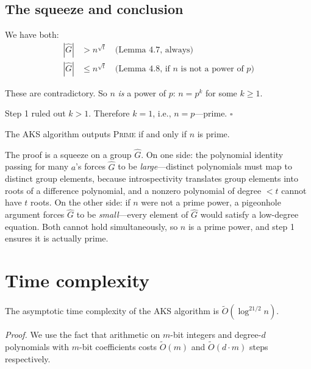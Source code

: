 \documentclass[12pt]{article}
\newcommand{\OO}{\widetilde{O}}
\begin{document}
\subsection{The squeeze and conclusion}

We have both:
\begin{align*}
  |\hat{G}| &> n^{\sqrt{t}} \quad\text{(Lemma 4.7, always)}\\
  |\hat{G}| &\leq n^{\sqrt{t}} \quad\text{(Lemma 4.8, if $n$ is not a power of $p$)}
\end{align*}

These are contradictory. So $n$ \emph{is} a power of $p$: $n=p^k$ for some $k\geq 1$.

Step 1 ruled out $k>1$. Therefore $k=1$, i.e., $n=p$---prime. $\square$

\begin{thmbox}[Theorem 4.1]
The AKS algorithm outputs \textsc{Prime} if and only if $n$ is prime.
\end{thmbox}

\begin{intubox}
The proof is a squeeze on a group $\hat{G}$. On one side: the polynomial identity passing for many $a$'s forces $\hat{G}$ to be \emph{large}---distinct polynomials must map to distinct group elements, because introspectivity translates group elements into roots of a difference polynomial, and a nonzero polynomial of degree $<t$ cannot have $t$ roots. On the other side: if $n$ were not a prime power, a pigeonhole argument forces $\hat{G}$ to be \emph{small}---every element of $\hat{G}$ would satisfy a low-degree equation. Both cannot hold simultaneously, so $n$ is a prime power, and step 1 ensures it is actually prime.
\end{intubox}

\section{Time complexity}

\begin{thmbox}[Theorem 5.1]
The asymptotic time complexity of the AKS algorithm is $\OO(\log^{21/2} n)$.
\end{thmbox}

\textit{Proof.} We use the fact that arithmetic on $m$-bit integers and degree-$d$ polynomials with $m$-bit coefficients costs $\OO(m)$ and $\OO(d\cdot m)$ steps respectively.
\end{document}
